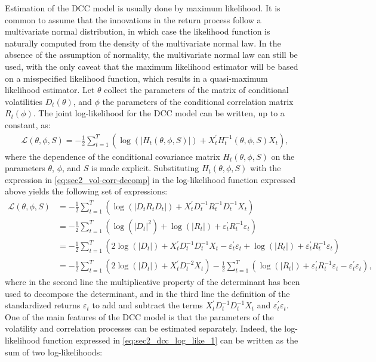 Estimation of the DCC model is usually done by maximum likelihood. It is common to assume that the innovations in the return process follow a multivariate normal distribution, in which case the likelihood function is naturally computed from the density of the multivariate normal law. In the absence of the assumption of normality, the multivariate normal law can still be used, with the only caveat that the maximum likelihood estimator will be based on a misspecified likelihood function, which results in a quasi-maximum likelihood estimator. Let $\theta$ collect the parameters of the matrix of conditional volatilities $D_t(\theta)$, and $\phi$ the parameters of the conditional correlation matrix $R_t(\phi)$. The joint log-likelihood for the DCC model can be written, up to a constant, as:
\begin{align}
	\mathcal{L}(\theta,\phi,S) = -\frac{1}{2} \sum_{t=1}^T \left( \operatorname{log} \left( |H_t(\theta,\phi,S)| \right) + X_t^\prime H_t^{-1}(\theta,\phi,S)X_t \right),
\end{align}
where the dependence of the conditional covariance matrix $H_t(\theta,\phi,S)$ on the parameters $\theta$, $\phi$, and $S$ is made explicit. Substituting $H_t(\theta,\phi,S)$ with the expression in \eqref{eq:sec2_vol-corr-decomp} in the log-likelihood function expressed above yields the following set of expressions:
\begin{align}
	\mathcal{L}(\theta,\phi,S) &= -\frac{1}{2} \sum_{t=1}^T \left( \operatorname{log}(|D_tR_tD_t|) + X_t^\prime D_t^{-1}R_t^{-1}D_t^{-1}X_t \right) \\
	&= - \frac{1}{2} \sum_{t=1}^T \left( \operatorname{log}(|D_t|^2) + \operatorname{log}(|R_t|) + \varepsilon_{t}^\prime R_t^{-1} \varepsilon_{t} \right) \\
	&= - \frac{1}{2} \sum_{t=1}^T \left( 2\operatorname{log}(|D_t|) + X_t^\prime D_t^{-1} D_t^{-1}X_t - \varepsilon_{t}^\prime \varepsilon_{t} + \operatorname{log}(|R_t|) + \varepsilon_{t}^\prime R_t^{-1} \varepsilon_{t} \right) \\
	&= - \frac{1}{2} \sum_{t=1}^T \left( 2\operatorname{log}(|D_t|) + X_t^\prime D_t^{-2}X_t \right) - \frac{1}{2} \sum_{t=1}^T \left( \operatorname{log}(|R_t|) + \varepsilon_{t}^\prime R_t^{-1}\varepsilon_{t} - \varepsilon_{t}^\prime \varepsilon_{t} \right), \label{eq:sec2_dcc_log_like_1}
\end{align}
where in the second line the multiplicative property of the determinant has been used to decompose the determinant, and in the third line the definition of the standardized returns $\varepsilon_{t}$ to add and subtract the terms $X_t^\prime D_t^{-1}D_t^{-1}X_t$ and $\varepsilon_{t}^\prime \varepsilon_{t}$. One of the main features of the DCC model is that the parameters of the volatility and correlation processes can be estimated separately. Indeed, the log-likelihood function expressed in \eqref{eq:sec2_dcc_log_like_1} can be written as the sum of two log-likelihoods:
